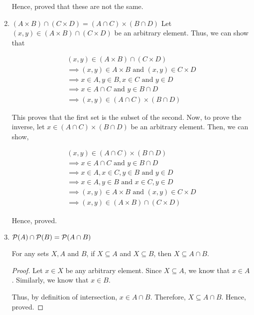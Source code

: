 \begin{enumerate}
				Hence, proved that these are not the same.
			\es

		\item $(A \times B) \cap (C \times D) = (A \cap C) \times (B \cap D)$ \label{cart-inter}
			\bs
				Let $(x, y) \in (A \times B) \cap (C \times D)$ be an arbitrary element. Thus, we can show that

				\begin{align}
					(x, y) \in (A \times B) \cap (C \times D) \\
					\implies (x, y) \in A \times B \text{ and } (x, y) \in C \times D \\
					\implies x \in A, y \in B, x \in C \text{ and } y \in D \\
					\implies x \in A \cap C \text{ and } y \in B \cap D \\
					\implies (x, y) \in (A \cap C) \times (B \cap D)
				\end{align}

				This proves that the first set is the subset of the second.
				Now, to prove the inverse, let $x \in (A \cap C) \times (B \cap D)$ be an arbitrary element. Then, we can show,

				\begin{align}
					(x, y) \in (A \cap C) \times (B \cap D) \\
					\implies x \in A \cap C \text{ and } y \in B \cap D \\
					\implies x \in A, x \in C, y \in B \text{ and } y \in D \\
					\implies x \in A, y \in B \text{ and } x \in C, y \in D \\
					\implies (x, y) \in A \times B \text{ and } (x, y) \in C \times D \\
					\implies (x, y) \in (A \times B) \cap (C \times D)
				\end{align}

				Hence, proved.
			\es


		\item $\mathcal{P}(A) \cap \mathcal{P}(B) = \mathcal{P}(A \cap B)$
			\bs
				\begin{lemma}\label{intersub}
					For any sets $X, A$ and $B$, if $X \subseteq A$ and $X \subseteq B$, then $X \subseteq A \cap B$.
				\end{lemma}
				\begin{proof}
					Let $x \in X$ be any arbitrary element.
					Since $X \subseteq A$, we know that $x \in A$.
					Similarly, we know that $x \in B$.

					Thus, by definition of intersection, $x \in A \cap B$. 
					Therefore, $X \subseteq A \cap B$. Hence, proved.
				\end{proof}



\end{enumerate}
